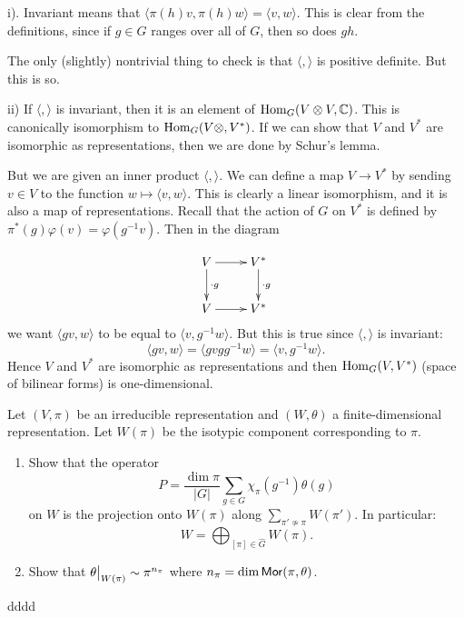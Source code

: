 \documentclass[11pt, english]{article}
\begin{document}
\begin{sol}
i). Invariant means that $\langle \pi(h) v, \pi(h) w \rangle = \langle v, w \rangle $. This is clear from the definitions, since if $g \in G$ ranges over all of $G$, then so does $gh$.

The only (slightly) nontrivial thing to check is that $\langle,\rangle$ is positive definite. But this is so.


ii) If $\langle,\rangle$ is invariant, then it is an element of $\operatorname{Hom}_G(V \otimes V, \mathbb{C})$. This is canonically isomorphism to $\operatorname{Hom}_G(V \otimes, V^\ast)$. If we can show that $V$ and $V^\ast$ are isomorphic as representations, then we are done by Schur's lemma. 

But we are given an inner product $\langle , \rangle$. We can define a map $V \to V^\ast$ by sending $v \in V$ to the function $w \mapsto \langle v, w \rangle$. This is clearly a linear isomorphism, and it is also a map of representations. Recall that the action of $G$ on $V^\ast$ is defined by $\pi^\ast(g) \varphi (v) = \varphi(g^{-1} v)$. Then in the diagram

$$
\xymatrix{
V \ar[r] \ar[d]^{\cdot g} & V^\ast \ar[d]^{\cdot g} \\
V \ar[r]  & V^\ast 
}
$$
we want $\langle gv, w \rangle$ to be equal to $\langle v, g^{-1} w \rangle$. But this is true since $\langle ,\rangle$ is invariant:
$$
\langle gv, w \rangle = \langle gv g g^{-1} w \rangle = \langle v, g^{-1}w \rangle.
$$
Hence $V$ and $V^\ast$ are isomorphic as representations and then $\operatorname{Hom}_G(V,V^\ast)$ (space of bilinear forms) is one-dimensional. 
\end{sol}

\begin{exc}
 Let $(V,\pi)$ be an irreducible representation and $(W,\theta)$ a finite-dimensional representation. Let $W(\pi)$ be the isotypic component corresponding to $\pi$.
 \begin{enumerate}
 \item Show that the operator
$$
P = \frac{\dim \pi}{\lvert G \rvert} \sum_{g \in G} \chi_\pi(g^{-1})\theta(g)
$$
on $W$ is the projection onto $W(\pi)$ along $\sum_{\pi' \not \simeq \pi} W(\pi')$. In particular:
$$
W = \bigoplus_{[\pi] \in \widehat G} W(\pi).
$$
\item Show that $\restr{\theta}{W(\pi)} \sim \pi^{n_\pi}$ where $n_\pi = \dim \mathsf{Mor}(\pi,\theta)$.
 \end{enumerate}
\end{exc}

\begin{sol}
dddd
\end{sol}
\end{document}
